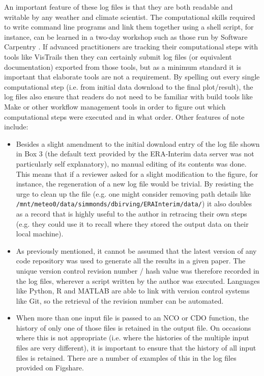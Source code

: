 An important feature of these log files is that they are both readable and writable by any weather and climate scientist. The computational skills required to write command line programs and link them together using a shell script, for instance, can be learned in a two-day workshop such as those run by Software Carpentry \citep{Wilson2014}. If advanced practitioners are tracking their computational steps with tools like VisTrails then they can certainly submit log files (or equivalent documentation) exported from those tools, but as a minimum standard it is important that elaborate tools are not a requirement. By spelling out every single computational step (i.e. from initial data download to the final plot/result), the log files also ensure that readers do not need to be familiar with build tools like Make or other workflow management tools in order to figure out which computational steps were executed and in what order. Other features of note include:
\begin{itemize}
\item Besides a slight amendment to the initial download entry of the log file shown in Box 3 (the default text provided by the ERA-Interim data server was not particularly self explanatory), no manual editing of its contents was done. This means that if a reviewer asked for a slight modification to the figure, for instance, the regeneration of a new log file would be trivial. By resisting the urge to clean up the file (e.g. one might consider removing path details like \verb|/mnt/meteo0/data/simmonds/dbirving/ERAInterim/data/|) it also doubles as a record that is highly useful to the author in retracing their own steps (e.g. they could use it to recall where they stored the output data on their local machine).
\item As previously mentioned, it cannot be assumed that the latest version of any code repository was used to generate all the results in a given paper. The unique version control revision number / hash value was therefore recorded in the log files, wherever a script written by the author was executed. Languages like Python, R and MATLAB are able to link with version control systems like Git, so the retrieval of the revision number can be automated.
\item When more than one input file is passed to an NCO or CDO function, the history of only one of those files is retained in the output file. On occasions where this is not appropriate (i.e. where the histories of the multiple input files are very different), it is important to ensure that the history of all input files is retained. There are a number of examples of this in the log files provided on Figshare. 
\end{itemize}
  
 
  
  
  
  
  
  
  
  
  
  
  
  
  
  
  
  
  
  
  
  
  
  
  
  
  
  